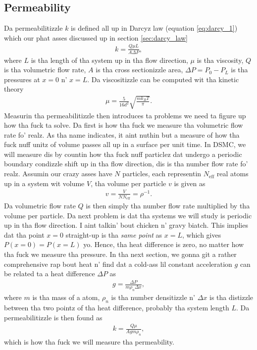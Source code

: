 \subsection{Permeability}
\label{sec:permeability_dsmc}
Da permeabilitizzle $k$ is defined all up in Darcyz law (equation \eqref{eq:darcy_1}) which our phat asses discussed up in section \ref{sec:darcy_law}
\begin{align}
	\label{eq:permeability_gas}
	k = \frac{Q \mu L}{A\Delta P},
\end{align}
where $L$ is tha length of tha system up in tha flow direction, $\mu$ is tha viscosity, $Q$ is tha volumetric flow rate, $A$ is tha cross sectionizzle area, $\Delta P = P_0 - P_L$ is tha pressures at $x=0$ n' $x=L$. Da viscositizzle can be computed wit tha kinetic theory \cite{alexander1998cell}
\begin{align}
	\mu = \frac{5}{16d^2}\sqrt{\frac{mk_B T}{\pi}}.
\end{align}
Measurin tha permeabilitizzle then introduces ta problems we need ta figure up how tha fuck ta solve. Da first is how tha fuck we measure tha volumetric flow rate fo' realz. As tha name indicates, it aint nuthin but a measure of how tha fuck nuff unitz of volume passes all up in a surface per unit time. In DSMC, we will measure dis by countin how tha fuck nuff particlez dat undergo a periodic boundary condizzle shift up in tha flow direction, dis is tha number flow rate fo' realz. Assumin our crazy asses have $N$ particles, each representin $N_\text{eff}$ real atoms up in a system wit volume $V$, tha volume per particle $v$ is given as
\begin{align}
 	v = \frac{V}{NN_\text{eff}} = \rho^{-1}.
\end{align} 
Da volumetric flow rate $Q$ is then simply tha number flow rate multiplied by tha volume per particle. Da next problem is dat tha systems we will study is periodic up in tha flow direction. I aint talkin' bout chicken n' gravy biatch. This implies dat tha point $x=0$ straight-up is tha \textit{same point} as $x=L$, which gives $P(x=0) = P(x=L)$ yo. Hence, tha heat difference is zero, no matter how tha fuck we measure tha pressure. In tha next section, we gonna git a rather comprehensive rap bout heat n' find dat a cold-ass lil constant acceleration $g$ can be related ta a heat difference $\Delta P$ as
\begin{align}
	g = \frac{\Delta P}{m\rho_n\Delta x},
\end{align}
where $m$ is tha mass of a atom, $\rho_n$ is tha number densitizzle n' $\Delta x$ is tha distizzle between tha two pointz of tha heat difference, probably tha system length $L$. Da permeabilitizzle is then found as
\begin{align}
	\label{eq:permeability_measure}
	k = \frac{Q \mu}{Agm\rho_n},
\end{align}
which is how tha fuck we will measure tha permeability.